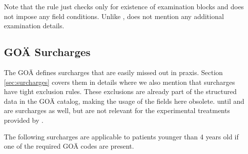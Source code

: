 Note that the rule just checks only for existence of examination blocks and does not impose any field conditions.
Unlike ,  does not mention any additional examination details.

\subsection{GOÄ Surcharges}\label{subsec:goa-surcharges}
The GOÄ defines surcharges that are easily missed out in praxis.
Section \ref{sec:surcharges} covers them in details where we also mention that surcharges have tight exclusion rules.
These exclusions are already part of the structured data in the GOÄ catalog, making the usage of the  fields here obsolete.
 until  and  are surcharges as well, but are not relevant for the experimental treatments provided by \AV.









The following surcharges are applicable to patients younger than 4 years old if one of the required GOÄ codes are present.






